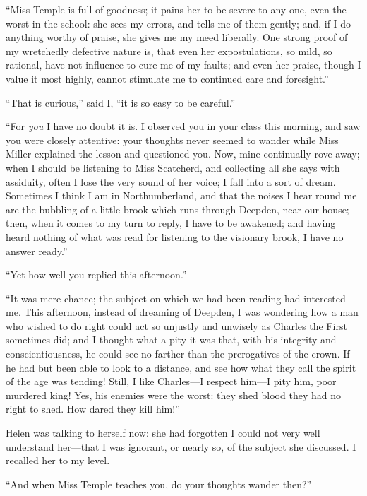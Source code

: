\enquote{Miss Temple is full of goodness; it pains her to be severe to
	any one, even the worst in the school: she sees my errors, and tells me
	of them gently; and, if I do anything worthy of praise, she gives me my
	meed liberally.  One strong proof of my wretchedly defective nature is,
	that even her expostulations, so mild, so rational, have not influence
	to cure me of my faults; and even her praise, though I value it most
	highly, cannot stimulate me to continued care and foresight.}

\enquote{That is curious,} said I, \enquote{it is so easy to be
	careful.}

\enquote{For \emph{you} I have no doubt it is.  I observed you in your class
	this morning, and saw you were closely attentive: your thoughts never
	seemed to wander while Miss Miller explained the lesson and questioned
	you.  Now, mine continually rove away; when I should be listening to
	Miss Scatcherd, and collecting all she says with assiduity, often I lose
	the very sound of her voice; I fall into a sort of dream.  Sometimes I
	think I am in Northumberland, and that the noises I hear round me are
	the bubbling of a little brook which runs through Deepden, near our
	house;---then, when it comes to my turn to reply, I have to be awakened;
	and having heard nothing of what was read for listening to the visionary
	brook, I have no answer ready.}

\enquote{Yet how well you replied this afternoon.}

\enquote{It was mere chance; the subject on which we had been reading
	had interested me.  This afternoon, instead of dreaming of Deepden, I
	was wondering how a man who wished to do right could act so unjustly and
	unwisely as Charles the First sometimes did; and I thought what a pity
	it was that, with his integrity and conscientiousness, he could see no
	farther than the prerogatives of the crown.  If he had but been able to
	look to a distance, and see how what they call the spirit of the age was
	tending!  Still, I like Charles---I respect him---I pity him, poor
	murdered king!  Yes, his enemies were the worst: they shed blood they
	had no right to shed.  How dared they kill him!}

Helen was talking to herself now: she had forgotten I could not very
well understand her---that I was ignorant, or nearly so, of the subject
she discussed.  I recalled her to my level.

\enquote{And when Miss Temple teaches you, do your thoughts wander
	then?}

